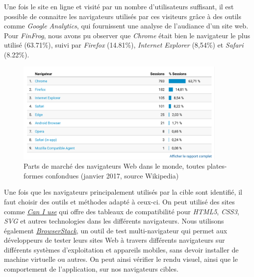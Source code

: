 \bigskip

Une fois le site en ligne et visité par un nombre d'utilisateurs
suffisant, il est possible de connaitre les navigateurs utilisés par ces
visiteurs grâce à des outils comme \emph{Google Analytics}, qui
fournissent une analyse de l'audiance d'un site web. Pour
\emph{FinFrog}, nous avons pu observer que \emph{Chrome} était bien le
navigateur le plus utilisé (63.71\%), suivi par \emph{Firefox}
(14.81\%), \emph{Internet Explorer} (8,54\%) et \emph{Safari} (8.22\%).

\begin{figure}[h]
  \centering
  \includegraphics[height=5cm]{figures/FF-browsers.png}
  \caption{Parts de marché des navigateurs Web dans le monde, toutes plates-formes confondues (janvier 2017, source Wikipedia)}
\end{figure}

\bigskip

Une fois que les navigateurs principalement utilisés par la cible sont
identifié, il faut choisir des outils et méthodes adapté à ceux-ci. On
peut utilisé des sites comme \href{http://caniuse.com/}{\emph{Can I
use}} qui offre des tableaux de compatibilité pour \emph{HTML5},
\emph{CSS3}, \emph{SVG} et autres technologies dans les différents
navigateurs. Nous utilisons également
\href{https://www.browserstack.com/}{\emph{BrowserStack}}, un outil de
test multi-navigateur qui permet aux développeurs de tester leurs sites
Web à travers différents navigateurs sur différents systèmes
d'exploitation et appareils mobiles, sans devoir installer de machine
virtuelle ou autres. On peut ainsi vérifier le rendu visuel, ainsi que
le comportement de l'application, sur nos navigateurs cibles.

\bigskip


